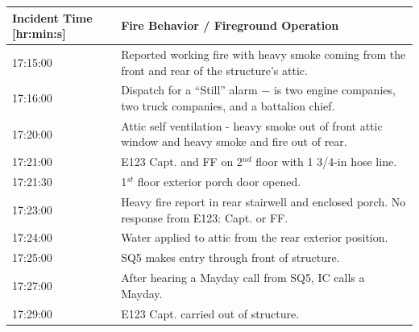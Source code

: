 \documentclass[11pt,oneside]{book}
\begin{document}
\begin{table}
\centering
{}\label{tab:fire_info}
\begin{tabular}{l l}
\toprule[1.5pt]
Incident Time [hr:min:s] & Fire Behavior / Fireground Operation  \\
\midrule
\multirow{2}{*}{17:15:00} & \multirow{2}{*}{\parbox{10cm} {Reported working fire with heavy smoke coming from the front and rear of the structure's attic.}} \\ 
         & \\[.25cm] %
\multirow{2}{*}{17:16:00}    &  \multirow{2}{*}{\parbox{10cm} {Dispatch for a ``Still'' alarm $-$ is two engine companies, two truck companies, and a battalion chief.}} \\
         & \\[.25cm]
\multirow{2}{*}{17:20:00}    & \multirow{2}{*}{\parbox{10cm} {Attic self ventilation - heavy smoke out of front attic window and heavy smoke and fire out of rear.}} \\
         & \\[.25cm] 
17:21:00 & E123 Capt. and FF on 2$^{nd}$ floor with 1 3/4-in hose line. \\[.25cm]
17:21:30 & 1$^{st}$ floor exterior porch door opened. \\[.25cm]
\multirow{2}{*}{17:23:00}    & \multirow{2}{*}{\parbox{10cm} {Heavy fire report in rear stairwell and enclosed porch. No response from E123: Capt. or FF.}} \\
         & \\[.25cm]
17:24:00    & Water applied to attic from the rear exterior position. \\[.25cm]
17:25:00    & SQ5 makes entry through front of structure. \\[.25cm]
17:27:00    & After hearing a Mayday call from SQ5, IC calls a Mayday. \\[.25cm]
17:29:00    & E123 Capt. carried out of structure. \\
\bottomrule[1.25pt]
\end{tabular}\par
\end{table}
 
\end{document}
